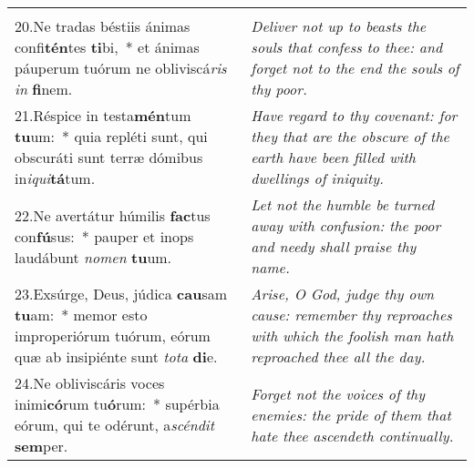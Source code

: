 \begin{longtable}{@{\hskip0pt} p{10cm} | p{6cm} @{\hskip0pt}}
{}\\
20.\enspace Ne tradas béstiis ánimas confi\textbf{tén}tes \textbf{ti}bi,~* et ánimas páuperum tuórum ne obliviscá\textit{ris} \textit{in} \textbf{fi}nem.
 & \textit{\small Deliver not up to beasts the souls that confess to thee: and forget not to the end the souls of thy poor.
}\\
21.\enspace Réspice in testa\textbf{mén}tum \textbf{tu}um:~* quia repléti sunt, qui obscuráti sunt terræ dómibus in\textit{i}\textit{qui}\textbf{tá}tum.
 & \textit{\small Have regard to thy covenant: for they that are the obscure of the earth have been filled with dwellings of iniquity.
}\\
22.\enspace Ne avertátur húmilis \textbf{fac}tus con\textbf{fú}sus:~* pauper et inops laudábunt \textit{no}\textit{men} \textbf{tu}um.
 & \textit{\small Let not the humble be turned away with confusion: the poor and needy shall praise thy name.
}\\
23.\enspace Exsúrge, Deus, júdica \textbf{cau}sam \textbf{tu}am:~* memor esto improperiórum tuórum, eórum quæ ab insipiénte sunt \textit{to}\textit{ta} \textbf{di}e.
 & \textit{\small Arise, O God, judge thy own cause: remember thy reproaches with which the foolish man hath reproached thee all the day.
}\\
24.\enspace Ne obliviscáris voces inimi\textbf{có}rum tu\textbf{ó}rum:~* supérbia eórum, qui te odérunt, a\textit{scén}\textit{dit} \textbf{sem}per. & \textit{\small Forget not the voices of thy enemies: the pride of them that hate thee ascendeth continually.}\\
\end{longtable}